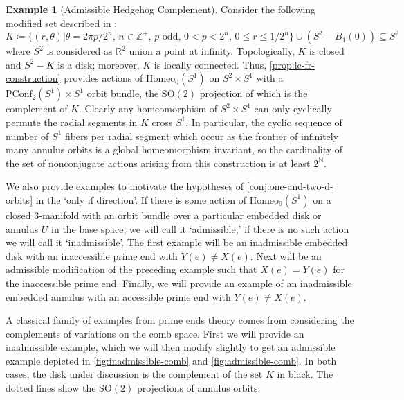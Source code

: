 \documentclass[10pt, oneside]{article}
\newcommand{\R}{\mathbb{R}}
\newcommand{\Z}{\mathbb{Z}}
\newcommand{\N}{\mathbb{N}}
\newcommand{\SO}[1][2]{\text{SO}(#1)}
\newcommand{\homeo}[1][S^1]{\text{Homeo}_0(#1)}
\newcommand{\pconf}[2][S^1]{\text{PConf}_{#2}(#1)}
\theoremstyle{definition}
\newtheorem{eg}{Example}[section]
\theoremstyle{definition}
\begin{document}
\begin{eg}[Admissible Hedgehog Complement]
    Consider the following modified set described in \cite{epstein_prime_1981}:
    $$K\coloneqq\{ (r, \theta) \vert \theta = 2\pi p/2^n,\, n\in \Z^+,\, p \text{ odd},\, 0 < p < 2^n,\, 0\leq r\leq 1/2^n\}\cup(S^2-B_1(0))\subseteq S^2$$
    where $S^2$ is considered as $\R^2$ union a point at infinity. Topologically, $K$ is closed and $S^2 - K$ is a disk; moreover, $K$ is locally connected. Thus, \cref{prop:lc-fr-construction} provides actions of $\homeo$ on $S^2\times S^1$ with a $\pconf{2}\times S^1$ orbit bundle, the $\SO$ projection of which is the complement of $K$. Clearly any homeomorphism of $S^2\times S^1$ can only cyclically permute the radial segments in $K$ cross $S^1$. In particular, the cyclic sequence of number of $S^1$ fibers per radial segment which occur as the frontier of infinitely many annulus orbits is a global homeomorphism invariant, so the cardinality of the set of nonconjugate actions arising from this construction is at least $2^\N$.
    
\end{eg}

We also provide examples to motivate the hypotheses of \cref{conj:one-and-two-d-orbits} in the `only if direction'. If there is some action of $\homeo$ on a closed 3-manifold with an orbit bundle over a particular embedded disk or annulus $U$ in the base space, we will call it `admissible,' if there is no such action we will call it `inadmissible'. The first example will be an inadmissible embedded disk with an inaccessible prime end with $Y(e)\neq X(e)$. Next will be an admissible modification of the preceding example such that $X(e) = Y(e)$ for the inaccessible prime end. Finally, we will provide an example of an inadmissible embedded annulus with an accessible prime end with $Y(e)\neq X(e)$.

A classical family of examples from prime ends theory comes from considering the complements of variations on the comb space. First we will provide an inadmissible example, which we will then modify slightly to get an admissible example depicted in \cref{fig:inadmissible-comb} and \cref{fig:admissible-comb}. In both cases, the disk under discussion is the complement of the set $K$ in black. The dotted lines show the $\SO$ projections of annulus orbits.
\end{document}
